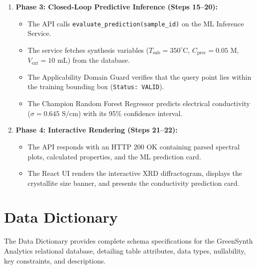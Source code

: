 \documentclass[12pt,a4paper,oneside]{report}
\begin{document}
{{{\begin{enumerate}
\begin{itemize}
    \end{itemize}
    \item \textbf{Phase 3: Closed-Loop Predictive Inference (Steps 15--20):}
    \begin{itemize}
        \item The API calls \texttt{evaluate\_prediction(sample\_id)} on the ML Inference Service.
        \item The service fetches synthesis variables ($T_{\text{sub}} = 350^\circ\text{C}$, $C_{\text{prec}} = 0.05\text{ M}$, $V_{\text{ext}} = 10\text{ mL}$) from the database.
        \item The Applicability Domain Guard verifies that the query point lies within the training bounding box (\texttt{Status: VALID}).
        \item The Champion Random Forest Regressor predicts electrical conductivity ($\sigma = 0.645\text{ S/cm}$) with its 95\% confidence interval.
    \end{itemize}
    \item \textbf{Phase 4: Interactive Rendering (Steps 21--22):}
    \begin{itemize}
        \item The API responds with an HTTP 200 OK containing parsed spectral plots, calculated properties, and the ML prediction card.
        \item The React UI renders the interactive XRD diffractogram, displays the crystallite size banner, and presents the conductivity prediction card.
    \end{itemize}
\end{enumerate}

\clearpage
\section{Data Dictionary}

The Data Dictionary provides complete schema specifications for the GreenSynth Analytics relational database, detailing table attributes, data types, nullability, key constraints, and descriptions.

}}}
\end{document}
